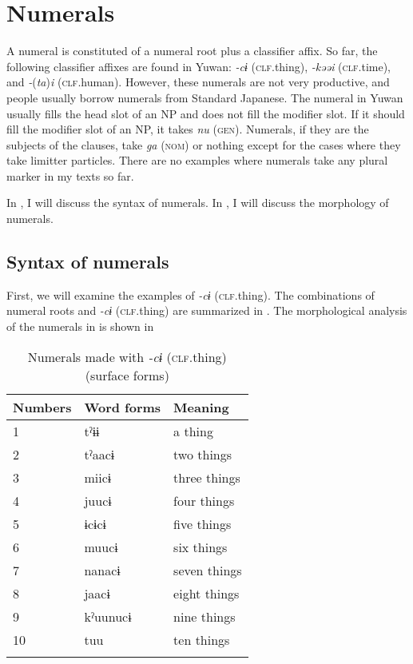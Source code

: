 \z

\section{Numerals}

A numeral is constituted of a numeral root plus a classifier affix. So far, the following classifier affixes are found in Yuwan: \textit{{}-cɨ} (\textsc{clf}.thing), \textit{{}-kəəi} (\textsc{clf}.time), and \textit{{}-}(\textit{ta})\textit{i} (\textsc{clf}.human). However, these numerals are not very productive, and people usually borrow numerals from Standard Japanese. The numeral in Yuwan usually fills the head slot of an NP and does not fill the modifier slot. If it should fill the modifier slot of an NP, it takes \textit{nu} (\textsc{gen}). Numerals, if they are the subjects of the clauses, take \textit{ga} (\textsc{nom}) or nothing except for the cases where they take limitter particles. There are no examples where numerals take any plural marker in my texts so far.

  In , I will discuss the syntax of numerals. In , I will discuss the morphology of numerals.

\subsection{Syntax of numerals}

First, we will examine the examples of \textit{{}-cɨ} (\textsc{clf}.thing). The combinations of numeral roots and \textit{{}-cɨ} (\textsc{clf}.thing) are summarized in . The morphological analysis of the numerals in  is shown in 

\begin{table}
\caption{\label{tab:key:47} Numerals made with \textit{-cɨ} (\textsc{clf}.thing) (surface forms)}

\begin{tabular}{lll}
\lsptoprule
Numbers  & Word forms  & Meaning\\
\midrule
1 & tˀɨɨ  &a thing\\
2 & tˀaacɨ&  two things     \\
3 & miicɨ & three things    \\
4 & juucɨ & four things     \\
5 & ɨcɨcɨ & five things     \\
6 & muucɨ & six things      \\
7 & nanacɨ&  seven things   \\
8 & jaacɨ & eight things    \\
9 & kˀuunucɨ & nine things  \\
10&  tuu    & ten things    \\
\lspbottomrule
\end{tabular}
\end{table}

